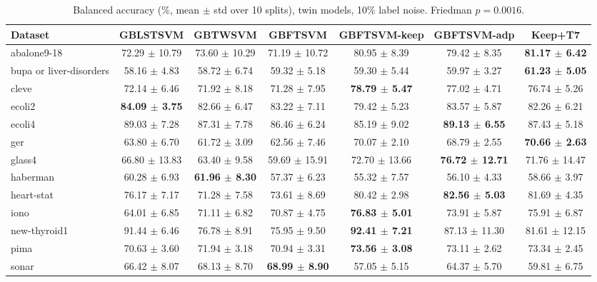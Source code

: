 \begin{table}[t]
\centering\small
\caption{Balanced accuracy (\%, mean $\pm$ std over 10 splits), twin models, 10\% label noise. Friedman $p = 0.0016$.}
\begin{tabular}{lcccccc}
\toprule
Dataset & GBLSTSVM & GBTWSVM & GBFTSVM & GBFTSVM-keep & GBFTSVM-adp & Keep+T7 \\
\midrule
abalone9-18 & 72.29 $\pm$ 10.79 & 73.60 $\pm$ 10.29 & 71.19 $\pm$ 10.72 & 80.95 $\pm$ 8.39 & 79.42 $\pm$ 8.35 & \textbf{81.17 $\pm$ 6.42} \\
bupa or liver-disorders & 58.16 $\pm$ 4.83 & 58.72 $\pm$ 6.74 & 59.32 $\pm$ 5.18 & 59.30 $\pm$ 5.44 & 59.97 $\pm$ 3.27 & \textbf{61.23 $\pm$ 5.05} \\
cleve & 72.14 $\pm$ 6.46 & 71.92 $\pm$ 8.18 & 71.28 $\pm$ 7.95 & \textbf{78.79 $\pm$ 5.47} & 77.02 $\pm$ 4.71 & 76.74 $\pm$ 5.26 \\
ecoli2 & \textbf{84.09 $\pm$ 3.75} & 82.66 $\pm$ 6.47 & 83.22 $\pm$ 7.11 & 79.42 $\pm$ 5.23 & 83.57 $\pm$ 5.87 & 82.26 $\pm$ 6.21 \\
ecoli4 & 89.03 $\pm$ 7.28 & 87.31 $\pm$ 7.78 & 86.46 $\pm$ 6.24 & 85.19 $\pm$ 9.02 & \textbf{89.13 $\pm$ 6.55} & 87.43 $\pm$ 5.18 \\
ger & 63.80 $\pm$ 6.70 & 61.72 $\pm$ 3.09 & 62.56 $\pm$ 7.46 & 70.07 $\pm$ 2.10 & 68.79 $\pm$ 2.55 & \textbf{70.66 $\pm$ 2.63} \\
glass4 & 66.80 $\pm$ 13.83 & 63.40 $\pm$ 9.58 & 59.69 $\pm$ 15.91 & 72.70 $\pm$ 13.66 & \textbf{76.72 $\pm$ 12.71} & 71.76 $\pm$ 14.47 \\
haberman & 60.28 $\pm$ 6.93 & \textbf{61.96 $\pm$ 8.30} & 57.37 $\pm$ 6.23 & 55.32 $\pm$ 7.57 & 56.10 $\pm$ 4.33 & 58.66 $\pm$ 3.97 \\
heart-stat & 76.17 $\pm$ 7.17 & 71.28 $\pm$ 7.58 & 73.61 $\pm$ 8.69 & 80.42 $\pm$ 2.98 & \textbf{82.56 $\pm$ 5.03} & 81.69 $\pm$ 4.35 \\
iono & 64.01 $\pm$ 6.85 & 71.11 $\pm$ 6.82 & 70.87 $\pm$ 4.75 & \textbf{76.83 $\pm$ 5.01} & 73.91 $\pm$ 5.87 & 75.91 $\pm$ 6.87 \\
new-thyroid1 & 91.44 $\pm$ 6.46 & 76.78 $\pm$ 8.91 & 75.95 $\pm$ 9.50 & \textbf{92.41 $\pm$ 7.21} & 87.13 $\pm$ 11.30 & 81.61 $\pm$ 12.15 \\
pima & 70.63 $\pm$ 3.60 & 71.94 $\pm$ 3.18 & 70.94 $\pm$ 3.31 & \textbf{73.56 $\pm$ 3.08} & 73.11 $\pm$ 2.62 & 73.34 $\pm$ 2.45 \\
sonar & 66.42 $\pm$ 8.07 & 68.13 $\pm$ 8.70 & \textbf{68.99 $\pm$ 8.90} & 57.05 $\pm$ 5.15 & 64.37 $\pm$ 5.70 & 59.81 $\pm$ 6.75 \\

\end{tabular}
\end{table}
